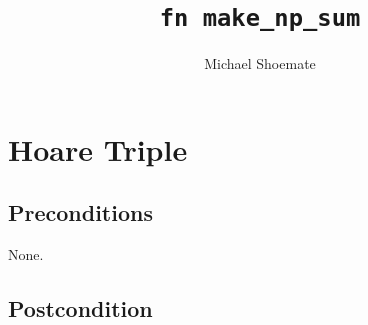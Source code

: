 \documentclass{article}
\title{\texttt{fn make\_np\_sum}}
\author{Michael Shoemate}
\begin{document}
\maketitle
\idealizedNumerics
\contrib

\section{Hoare Triple}
\subsection*{Preconditions}
None.

\subsection*{Postcondition}
\begin{theorem}
\end{theorem}
\end{document}
